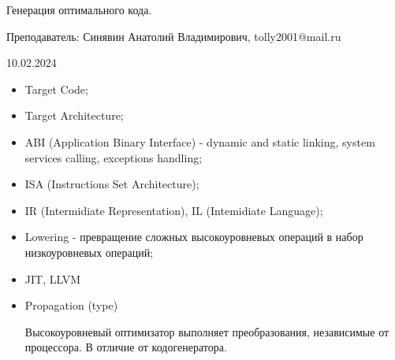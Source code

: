 \documentclass{article}
\begin{document}
Генерация оптимального кода.

Преподаватель: Синявин Анатолий Владимирович, tolly2001@mail.ru

10.02.2024

\begin{itemize}
  \item Target Code;
  \item Target Architecture;
  \item ABI (Application Binary Interface) - dynamic and static linking, system
    services calling, exceptions handling;
  \item ISA (Instructions Set Architecture);
  \item IR (Intermidiate Representation), IL (Intemidiate Language);
  \item Lowering - превращение сложных высокоуровневых операций в набор
    низкоуровневых операций;
  \item JIT, LLVM
  \item Propagation (type)

  Высокоуровневый оптимизатор выполняет преобразования, независимые от
  процессора. В отличие от кодогенератора.
\end{itemize}
\end{document}
